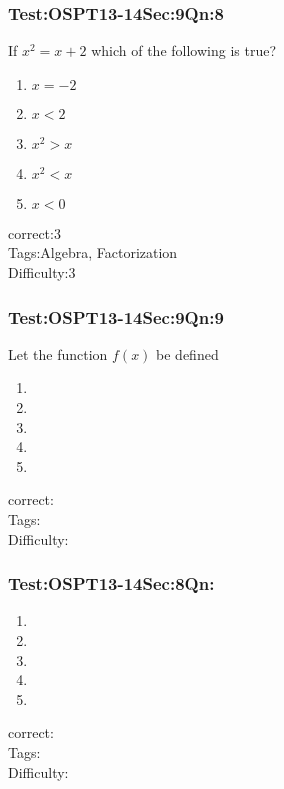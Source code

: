 \documentclass[]{beamer}
\begin{document}
    \begin{frame}
	    \frametitle{Test:OSPT13-14\hspace{2mm}Sec:9\hspace{2mm}Qn:8}
		If $x^2=x+2$ which of the following is true?	   
	   \begin{enumerate}
	        \item
	           $x=-2$
	        \item
	            $x<2$
	        \item
	           $x^2>x$
	        \item
	            $x^2<x$
	        \item
	           $x<0$
	    \end{enumerate}
	    correct:3\\   
	    Tags:Algebra, Factorization \\
	    Difficulty:3   \\
    \end{frame}    
    \begin{frame}
	    \frametitle{Test:OSPT13-14\hspace{2mm}Sec:9\hspace{2mm}Qn:9}
	    Let the function $f(x)$ be defined 
	   \begin{enumerate}
	        \item
	           
	        \item
	            
	        \item
	           
	        \item
	            
	        \item
	           
	    \end{enumerate}
	    correct:\\   
	    Tags: \\
	    Difficulty:   \\
    \end{frame}    
    \begin{frame}
	    \frametitle{Test:OSPT13-14\hspace{2mm}Sec:8\hspace{2mm}Qn:}
	   \begin{enumerate}
	        \item
	           
	        \item
	            
	        \item
	           
	        \item
	            
	        \item
	           
	    \end{enumerate}
	    correct:\\   
	    Tags: \\
	    Difficulty:   \\
    \end{frame}    
\end{document}
